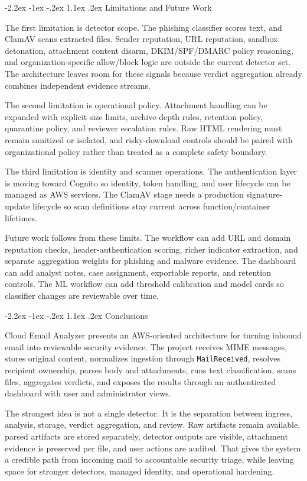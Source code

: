 \documentclass[12pt,a4paper]{article}
\makeatletter
\renewcommand\section{\@startsection {section}{1}{\z@}%
  {-2.2ex \@plus -1ex \@minus -.2ex}%
  {1.1ex \@plus .2ex}%
  {\centering\normalfont\normalsize\bfseries}}
\makeatother
\begin{document}
\section{Limitations and Future Work}

The first limitation is detector scope. The phishing classifier scores text, and ClamAV scans extracted files. Sender reputation, URL reputation, sandbox detonation, attachment content disarm, DKIM/SPF/DMARC policy reasoning, and organization-specific allow/block logic are outside the current detector set. The architecture leaves room for these signals because verdict aggregation already combines independent evidence streams.

The second limitation is operational policy. Attachment handling can be expanded with explicit size limits, archive-depth rules, retention policy, quarantine policy, and reviewer escalation rules. Raw HTML rendering must remain sanitized or isolated, and risky-download controls should be paired with organizational policy rather than treated as a complete safety boundary.

The third limitation is identity and scanner operations. The authentication layer is moving toward Cognito so identity, token handling, and user lifecycle can be managed as AWS services. The ClamAV stage needs a production signature-update lifecycle so scan definitions stay current across function/container lifetimes.

Future work follows from these limits. The workflow can add URL and domain reputation checks, header-authentication scoring, richer indicator extraction, and separate aggregation weights for phishing and malware evidence. The dashboard can add analyst notes, case assignment, exportable reports, and retention controls. The ML workflow can add threshold calibration and model cards so classifier changes are reviewable over time.

\section{Conclusions}

Cloud Email Analyzer presents an AWS-oriented architecture for turning inbound email into reviewable security evidence. The project receives MIME messages, stores original content, normalizes ingestion through \texttt{MailReceived}, resolves recipient ownership, parses body and attachments, runs text classification, scans files, aggregates verdicts, and exposes the results through an authenticated dashboard with user and administrator views.

The strongest idea is not a single detector. It is the separation between ingress, analysis, storage, verdict aggregation, and review. Raw artifacts remain available, parsed artifacts are stored separately, detector outputs are visible, attachment evidence is preserved per file, and user actions are audited. That gives the system a credible path from incoming mail to accountable security triage, while leaving space for stronger detectors, managed identity, and operational hardening.

\begingroup
\raggedright


\endgroup
\end{document}

